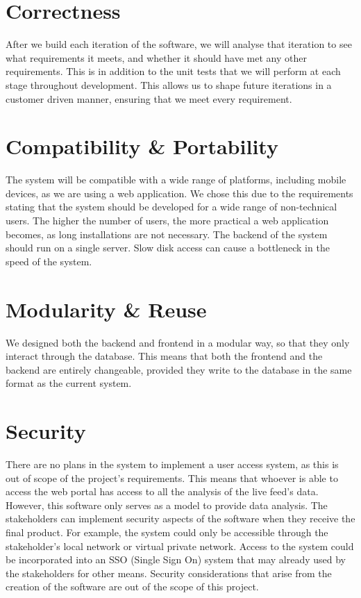 \documentclass[11pt, oneside, a4paper]{article}
\begin{document}
\section{Correctness}
After we build each iteration of the software, we will analyse that iteration to
see what requirements it meets, and whether it should have met any other requirements.
This is in addition to the unit tests that we will perform at each stage throughout
development. This allows us to shape future iterations in a customer driven manner,
ensuring that we meet every requirement.

\section{Compatibility \& Portability}
The system will be compatible with a wide range of platforms, including mobile
devices, as we are using a web application. We chose this due to the requirements
stating that the system should be developed for a wide range of non-technical users.
The higher the number of users, the more practical a web application becomes, as
long installations are not necessary. The backend of the system should run on a
single server. Slow disk access can cause a bottleneck in the speed of the system.

\section{Modularity \& Reuse}
We designed both the backend and frontend in a modular way, so that they only
interact through the database. This means that both the frontend and the backend
are entirely changeable, provided they write to the database in the same format
as the current system.

\section{Security}
There are no plans in the system to implement a user access system, as this is out
of scope of the project’s requirements. This means that whoever is able to access
the web portal has access to all  the analysis of the live feed’s data. However,
this software only serves as a model to provide data analysis. The stakeholders
can implement security aspects of the software when they receive the final product.
For example, the system could only be accessible through the stakeholder’s local
network or virtual private network. Access to the system could be incorporated
into an SSO (Single Sign On) system that may already used by the stakeholders for
other means. Security considerations that arise from the creation of the software
are out of the scope of this project.
\end{document}
